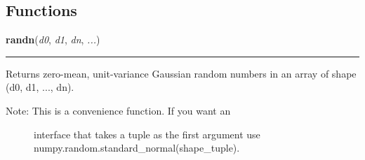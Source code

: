 
  \subsection{Functions}

    \label{peach:nn:nnet:randn}

    \vspace{0.5ex}

\hspace{.8\funcindent}\begin{boxedminipage}{\funcwidth}

    \raggedright \textbf{randn}(\textit{d0}, \textit{d1}, \textit{dn}, \textit{...})

    \vspace{-1.5ex}

    \rule{\textwidth}{0.5\fboxrule}
\setlength{\parskip}{2ex}

Returns zero-mean, unit-variance Gaussian random numbers in an
array of shape (d0, d1, ..., dn).
%
\begin{description}
\item[{Note:  This is a convenience function. If you want an}] \leavevmode 
interface that takes a tuple as the first argument
use numpy.random.standard\_normal(shape\_tuple).

\end{description}
\setlength{\parskip}{1ex}
    \end{boxedminipage}

    \label{peach:random}

    \vspace{0.5ex}

